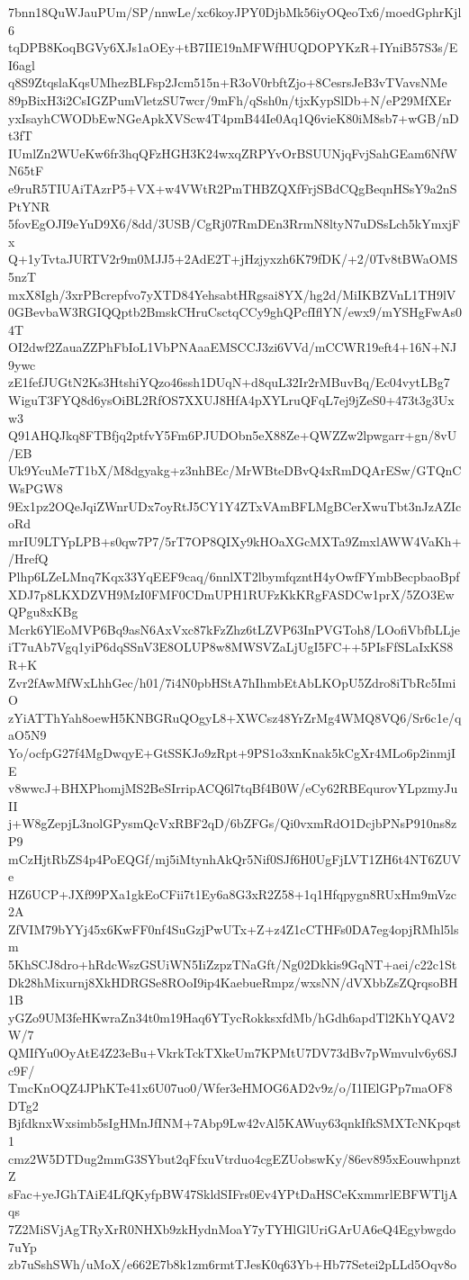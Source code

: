 7bnn18QuWJauPUm/SP/nnwLe/xc6koyJPY0DjbMk56iyOQeoTx6/moedGphrKjl6
tqDPB8KoqBGVy6XJs1aOEy+tB7IIE19nMFWfHUQDOPYKzR+IYniB57S3s/EI6agl
q8S9ZtqslaKqsUMhezBLFsp2Jcm515n+R3oV0rbftZjo+8CesrsJeB3vTVavsNMe
89pBixH3i2CsIGZPumVletzSU7wcr/9mFh/qSsh0n/tjxKypSlDb+N/eP29MfXEr
yxIsayhCWODbEwNGeApkXVScw4T4pmB44Ie0Aq1Q6vieK80iM8sb7+wGB/nDt3fT
IUmlZn2WUeKw6fr3hqQFzHGH3K24wxqZRPYvOrBSUUNjqFvjSahGEam6NfWN65tF
e9ruR5TIUAiTAzrP5+VX+w4VWtR2PmTHBZQXfFrjSBdCQgBeqnHSsY9a2nSPtYNR
5fovEgOJI9eYuD9X6/8dd/3USB/CgRj07RmDEn3RrmN8ltyN7uDSsLch5kYmxjFx
Q+1yTvtaJURTV2r9m0MJJ5+2AdE2T+jHzjyxzh6K79fDK/+2/0Tv8tBWaOMS5nzT
mxX8Igh/3xrPBcrepfvo7yXTD84YehsabtHRgsai8YX/hg2d/MiIKBZVnL1TH9lV
0GBevbaW3RGIQQptb2BmskCHruCsctqCCy9ghQPcfIflYN/ewx9/mYSHgFwAs04T
OI2dwf2ZauaZZPhFbIoL1VbPNAaaEMSCCJ3zi6VVd/mCCWR19eft4+16N+NJ9ywc
zE1fefJUGtN2Ks3HtshiYQzo46ssh1DUqN+d8quL32Ir2rMBuvBq/Ec04vytLBg7
WiguT3FYQ8d6ysOiBL2RfOS7XXUJ8HfA4pXYLruQFqL7ej9jZeS0+473t3g3Uxw3
Q91AHQJkq8FTBfjq2ptfvY5Fm6PJUDObn5eX88Ze+QWZZw2lpwgarr+gn/8vU/EB
Uk9YcuMe7T1bX/M8dgyakg+z3nhBEc/MrWBteDBvQ4xRmDQArESw/GTQnCWsPGW8
9Ex1pz2OQeJqiZWnrUDx7oyRtJ5CY1Y4ZTxVAmBFLMgBCerXwuTbt3nJzAZIcoRd
mrIU9LTYpLPB+s0qw7P7/5rT7OP8QIXy9kHOaXGcMXTa9ZmxlAWW4VaKh+/HrefQ
Plhp6LZeLMnq7Kqx33YqEEF9caq/6nnlXT2lbymfqzntH4yOwfFYmbBecpbaoBpf
XDJ7p8LKXDZVH9MzI0FMF0CDmUPH1RUFzKkKRgFASDCw1prX/5ZO3EwQPgu8xKBg
Mcrk6YlEoMVP6Bq9asN6AxVxc87kFzZhz6tLZVP63InPVGToh8/LOofiVbfbLLje
iT7uAb7Vgq1yiP6dqSSnV3E8OLUP8w8MWSVZaLjUgI5FC++5PIsFfSLaIxKS8R+K
Zvr2fAwMfWxLhhGec/h01/7i4N0pbHStA7hIhmbEtAbLKOpU5Zdro8iTbRc5ImiO
zYiATThYah8oewH5KNBGRuQOgyL8+XWCsz48YrZrMg4WMQ8VQ6/Sr6c1e/qaO5N9
Yo/ocfpG27f4MgDwqyE+GtSSKJo9zRpt+9PS1o3xnKnak5kCgXr4MLo6p2inmjIE
v8wwcJ+BHXPhomjMS2BeSIrripACQ6l7tqBf4B0W/eCy62RBEqurovYLpzmyJuII
j+W8gZepjL3nolGPysmQcVxRBF2qD/6bZFGs/Qi0vxmRdO1DcjbPNsP910ns8zP9
mCzHjtRbZS4p4PoEQGf/mj5iMtynhAkQr5Nif0SJf6H0UgFjLVT1ZH6t4NT6ZUVe
HZ6UCP+JXf99PXa1gkEoCFii7t1Ey6a8G3xR2Z58+1q1Hfqpygn8RUxHm9mVzc2A
ZfVIM79bYYj45x6KwFF0nf4SuGzjPwUTx+Z+z4Z1cCTHFs0DA7eg4opjRMhl5lsm
5KhSCJ8dro+hRdcWszGSUiWN5IiZzpzTNaGft/Ng02Dkkis9GqNT+aei/c22c1St
Dk28hMixurnj8XkHDRGSe8ROoI9ip4KaebueRmpz/wxsNN/dVXbbZsZQrqsoBH1B
yGZo9UM3feHKwraZn34t0m19Haq6YTycRokksxfdMb/hGdh6apdTl2KhYQAV2W/7
QMIfYu0OyAtE4Z23eBu+VkrkTckTXkeUm7KPMtU7DV73dBv7pWmvulv6y6SJc9F/
TmcKnOQZ4JPhKTe41x6U07uo0/Wfer3eHMOG6AD2v9z/o/I1IElGPp7maOF8DTg2
BjfdknxWxsimb5sIgHMnJfINM+7Abp9Lw42vAl5KAWuy63qnkIfkSMXTcNKpqst1
cmz2W5DTDug2mmG3SYbut2qFfxuVtrduo4cgEZUobswKy/86ev895xEouwhpnztZ
sFac+yeJGhTAiE4LfQKyfpBW47SkldSIFrs0Ev4YPtDaHSCeKxmmrlEBFWTljAqs
7Z2MiSVjAgTRyXrR0NHXb9zkHydnMoaY7yTYHlGlUriGArUA6eQ4Egybwgdo7uYp
zb7uSshSWh/uMoX/e662E7b8k1zm6rmtTJesK0q63Yb+Hb77Setei2pLLd5Oqv8o

